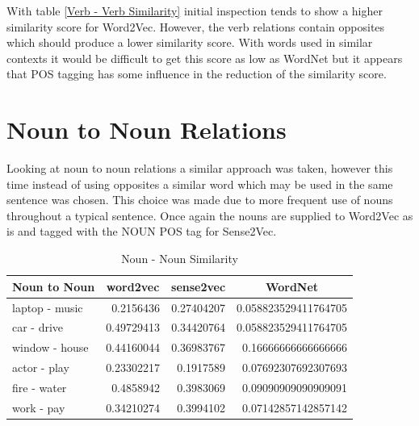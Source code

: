 \noindent
With table \ref{Verb - Verb Similarity} initial inspection tends to show a higher similarity score for Word2Vec. However, the verb relations contain opposites which should produce a lower similarity score. With words used in similar contexts it would be difficult to get this score as low as WordNet but it appears that POS tagging has some influence in the reduction of the similarity score.

\section{Noun to Noun Relations}
Looking at noun to noun relations a similar approach was taken, however this time instead of using opposites a similar word which may be used in the same sentence was chosen. This choice was made due to more frequent use of nouns throughout a typical sentence. Once again the nouns are supplied to Word2Vec as is and tagged with the NOUN POS tag for Sense2Vec.

\begin{table}[h]
\centering
\begin{tabular}{|l|r|r|r|}
\hline
\multicolumn{1}{|c|}{\textbf{Noun to Noun}} & \multicolumn{1}{c|}{\textbf{word2vec}} & \multicolumn{1}{c|}{\textbf{sense2vec}} & \multicolumn{1}{c|}{\textbf{WordNet}} \\ \hline
laptop - music                              & 0.2156436                              & 0.27404207                              & 0.058823529411764705                  \\ \hline
car - drive                                 & 0.49729413                             & 0.34420764                              & 0.058823529411764705                  \\ \hline
window - house                              & 0.44160044                             & 0.36983767                              & 0.16666666666666666                   \\ \hline
actor - play                                & 0.23302217                             & 0.1917589                               & 0.07692307692307693                   \\ \hline
fire - water                                & 0.4858942                              & 0.3983069                               & 0.09090909090909091                   \\ \hline
work - pay                                  & 0.34210274                             & 0.3994102                               & 0.07142857142857142                   \\ \hline
\end{tabular}
\caption{Noun - Noun Similarity}
\label{Noun - Noun Similarity}
\end{table}

